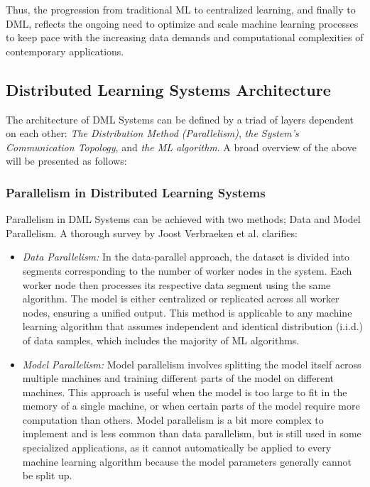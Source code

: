 Thus, the progression from traditional ML to centralized learning, and finally to DML, reflects the ongoing need to optimize and scale
machine learning processes to keep pace with the increasing data demands and computational complexities of contemporary applications.
\subsection{Distributed Learning Systems Architecture}
\label{sec:dml_architecture}
The architecture of DML Systems can be defined by a triad of layers dependent on each other: \emph{The Distribution Method (Parallelism)},
\emph{the System's Communication Topology}, and \emph{the ML algorithm}. A broad overview of the above will be presented as follows:

\subsubsection{Parallelism in Distributed Learning Systems}\label{sec:parallelism}
Parallelism in DML Systems can be achieved with two methods; Data and Model Parallelism.
A thorough survey by Joost Verbraeken et al.\cite{joostverbraekenSurveyDistributedMachine} clarifies:
\begin{itemize}
    \item \emph{Data Parallelism:} In the data-parallel approach, the dataset is divided into segments corresponding to the number of worker nodes
          in the system. Each worker node then processes its respective data segment using the same algorithm. The model is either centralized or replicated
          across all worker nodes, ensuring a unified output. This method is applicable to any machine learning algorithm that assumes independent and
          identical distribution (i.i.d.) of data samples, which includes the majority of ML algorithms.

    \item \emph{Model Parallelism:} Model parallelism involves splitting the model itself across multiple machines and training different parts of the model
          on different machines. This approach is useful when the model is too large to fit in the memory of a single machine, or when certain parts of the model
          require more computation than others. Model parallelism is a bit more complex to implement and is less common than data parallelism, but is still used in
          some specialized applications, as it cannot automatically be applied to every machine learning algorithm because the model parameters generally cannot be split up.
\end{itemize}

